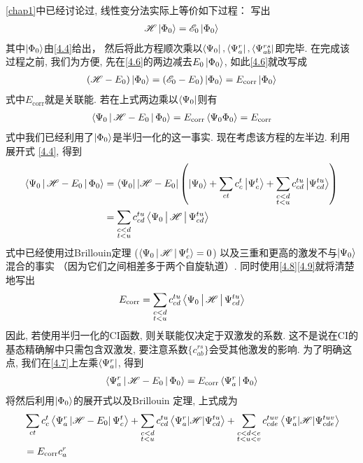 \autoref*{chap1}中已经讨论过, 线性变分法实际上等价如下过程： 写出
\begin{align}
\mathscr{H}\Ket{\Phi_0} = \mathscr{E}_0\Ket{\Phi_0}
\label{4.6}
\end{align}
其中$ \Ket{\Phi_0} $由\eqref{4.4}给出， 
然后将此方程顺次乘以$ \Bra{\Psi_0},\Bra{\Psi_a^r} ,\Bra{\Psi_{ab}^{rs}}$即完毕. 
在完成该过程之前, 
我们为方便, 
先在\eqref{4.6}的两边减去$ E_0\Ket{\Phi_0} $, 
如此\eqref{4.6}就改写成
\begin{align}
(\mathscr{H} -E_0)\Ket{\Phi_0} = (\mathscr{E}_0-E_0)\Ket{\Phi_0} = E_\mathrm{corr} \Ket{\Phi_0}
\label{4.7}
\end{align} 
式中$E_\mathrm{corr}$就是关联能. 
若在上式两边乘以$\Bra{\Psi_0}$则有
\begin{align}
\label{4.8}
\Braket{\Psi_0|\mathscr{H}-E_0|\Phi_0} = E_\mathrm{corr} \Braket{\Psi_0\Phi_0} = E_\mathrm{corr}
\end{align}
式中我们已经利用了$\Ket{\Phi_0}$是半归一化的这一事实. 
现在考虑该方程的左半边. 
利用展开式 \eqref{4.4}, 
得到
\begin{align}
\Braket{\Psi_0|\mathscr{H}-E_0|\Phi_0} & = \Bra{\Psi_0}|\mathscr{H}-E_0|\left( \Ket{\Psi_0} + \sum_{ct}c_c^t\Ket{\Psi_c^t} + \sum_{\substack{c<d\\t<u}} c_{cd}^{tu}\Ket{\Psi_{cd}^{tu}} \right)\notag \\
	&=\sum_{\substack{c<d\\t<u}}c_{cd}^{tu}\Braket{\Psi_0|\mathscr{H}|\Psi_{cd}^{tu}} \label{4.9}
\end{align}
式中已经使用过Brillouin定理 ($ \Braket{\Psi_0|\mathscr{H}|\Psi_c^t }=0$) 以及三重和更高的激发不与$\Ket{\Psi_0}$混合的事实 （因为它们之间相差多于两个自旋轨道）. 
同时使用\eqref{4.8}\eqref{4.9}就将清楚地写出
\begin{align}
E_\mathrm{corr} = \sum_{\substack{c<d\\t<u}}c_{cd}^{tu}\Braket{\Psi_0|\mathscr{H}|\Psi_{cd}^{tu}}
\end{align}
因此, 
若使用半归一化的CI函数, 
则关联能仅决定于双激发的系数. 
这不是说在CI的基态精确解中只需包含双激发, 
要注意系数$ \{c_{ab}^{rs}\} $会受其他激发的影响. 
为了明确这点, 
我们在\eqref{4.7}上左乘$ \Bra{\Psi_a^r} $, 
得到
\begin{align}
\Braket{\Psi_a^r|\mathscr{H}-E_0|\Phi_0} = E_\mathrm{corr} \Braket{\Psi_a^r|\Phi_0}
\label{4.10}
\end{align}
将然后利用$\Ket{\Phi_0}$的展开式以及Brillouin 定理, 
上式成为
\begin{align}
&\sum_{c t} c_{c}^{t}\left\langle\Psi_{a}^{r}\left|\mathscr{H}-E_{0}\right| \Psi_{c}^{t}\right\rangle+\sum_{\substack{c<d \\ t<u}} c_{cd}^{t u}\left\langle\Psi_{a}^{r}|\mathscr{H}| \Psi_{c d}^{t u}\right\rangle+\sum_{\substack{c<d<e\\ t<u<v}} c_{c d e}^{t u v}\left\langle\Psi_{a}^{r}|\mathscr{H}| \Psi_{c d e}^{t u v}\right\rangle \notag \\
&=E_{\mathrm{corr}} c_{a}^{r}
\label{4.11}
\end{align}
